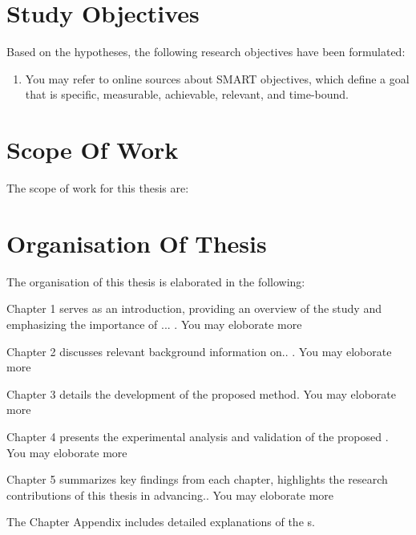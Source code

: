 \section{Study Objectives}



Based on the hypotheses, the following research objectives have been formulated:

\begin{enumerate}    
    \item  You may refer to online sources about SMART objectives, which define a goal that is specific, measurable, achievable, relevant, and time-bound.


       


    
\end{enumerate}



\section{Scope Of Work}

The scope of work for this thesis are:

\begin{enumerate}    


	
\end{enumerate}

\section{Organisation Of Thesis}
\label{ThesisOrganisation}


\noindent The organisation of this thesis is elaborated in the following:

Chapter 1 serves as an introduction, providing an overview of the study and emphasizing the importance of ... . You may eloborate more

Chapter 2 discusses relevant background information on.. . You may eloborate more

Chapter 3 details the development of the proposed method. You may eloborate more

Chapter 4 presents the experimental analysis and validation of the proposed . You may eloborate more

Chapter 5 summarizes key findings from each chapter, highlights the research contributions of this thesis in advancing.. You may eloborate more


The Chapter Appendix includes detailed explanations of the s.